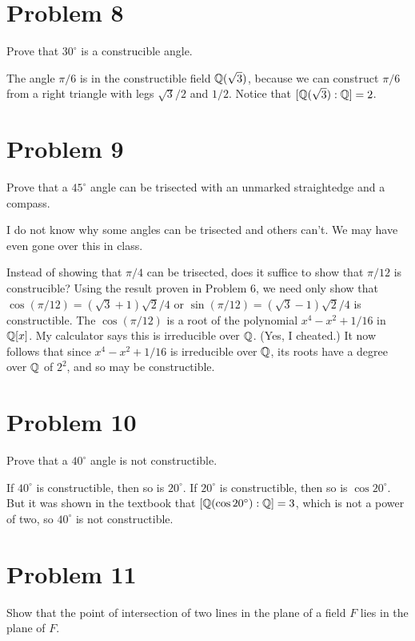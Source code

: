 \documentclass{article}
\begin{document}
\section*{Problem 8}

Prove that $30^{\circ}$ is a construcible angle.

The angle $\pi/6$ is in the constructible field $\mathbb{Q}(\sqrt{3})$, because we can
construct $\pi/6$ from a right triangle with legs $\sqrt{3}/2$ and $1/2$.
Notice that $[\mathbb{Q}(\sqrt{3}):\mathbb{Q}]=2$.

\section*{Problem 9}

Prove that a $45^{\circ}$ angle can be trisected with an unmarked straightedge and a compass.

I do not know why some angles can be trisected and others can't.  We may have even gone
over this in class.

Instead of showing that $\pi/4$ can be trisected, does it suffice to show that
$\pi/12$ is construcible?  Using the result proven in Problem 6, we need only
show that $\cos(\pi/12)=(\sqrt{3}+1)\sqrt{2}/4$ or $\sin(\pi/12)=(\sqrt{3}-1)\sqrt{2}/4$
is constructible.  The $\cos(\pi/12)$ is a root of the polynomial $x^4-x^2+1/16$ in $\mathbb{Q}[x]$.
My calculator says this is irreducible over $\mathbb{Q}$.  (Yes, I cheated.)
It now follows that since $x^4-x^2+1/16$ is irreducible over $\mathbb{Q}$, its roots have a
degree over $\mathbb{Q}$ of $2^2$, and so may be constructible.

\section*{Problem 10}

Prove that a $40^{\circ}$ angle is not constructible.

If $40^{\circ}$ is constructible, then so is $20^{\circ}$.  If $20^{\circ}$ is
constructible, then so is $\cos 20^{\circ}$.  But it was shown in the textbook that
$[\mathbb{Q}(\cos 20^{\circ}):\mathbb{Q}]=3$, which is not a power of two, so $40^{\circ}$ is not
constructible.

\section*{Problem 11}

Show that the point of intersection of two lines in the plane of a field $F$
lies in the plane of $F$.
\end{document}
